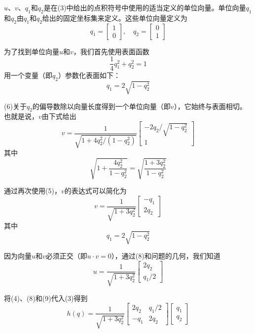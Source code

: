 \documentclass[12pt,a4paper]{ctexart}
\begin{document}
$u$、$v$、$q_1$和$q_2$是在(3)中给出的点积符号中使用的适当定义的单位向量。单位向量$q_1$和$q_2$由$q_1$和$q_2$给出的固定坐标集来定义。这些单位向量定义为
\begin{equation}
q_1 = \begin{bmatrix} 1 \\ 0 \end{bmatrix}, \quad q_2 = \begin{bmatrix} 0 \\ 1 \end{bmatrix}
\end{equation}

为了找到单位向量$u$和$v$，我们首先使用表面函数
\begin{equation}
\frac{1}{4}q_1^2 + q_2^2 = 1
\end{equation}
用一个变量（即$q_2$）参数化表面如下：
\begin{equation}
q_1 = 2\sqrt{1 - q_2^2}
\end{equation}

(6)关于$q_2$的偏导数除以向量长度得到一个单位向量（即$v$），它始终与表面相切。也就是说，$v$由下式给出
\begin{equation}
v = \frac{1}{\sqrt{1 + 4q_2^2/(1 - q_2^2)}} \begin{bmatrix} -2q_2/\sqrt{1 - q_2^2} \\ 1 \end{bmatrix}
\end{equation}
其中
\[
\sqrt{1 + \frac{4q_2^2}{1 - q_2^2}} = \sqrt{\frac{1 + 3q_2^2}{1 - q_2^2}}
\]

通过再次使用(5)，$v$的表达式可以简化为
\begin{equation}
v = \frac{1}{\sqrt{1 + 3q_2^2}} \begin{bmatrix} -q_1 \\ 2q_2 \end{bmatrix}
\end{equation}
其中
\[
q_1 = 2\sqrt{1 - q_2^2}
\]

因为向量$u$和$v$必须正交（即$u \cdot v = 0$），通过(8)和问题的几何，我们知道
\begin{equation}
u = \frac{1}{\sqrt{1 + 3q_2^2}} \begin{bmatrix} 2q_2 \\ q_1/2 \end{bmatrix}
\end{equation}

将(4)、(8)和(9)代入(3)得到
\begin{equation}
h(q) = \frac{1}{\sqrt{1 + 3q_2^2}} \begin{bmatrix} 2q_2 & q_1/2 \\ -q_1 & 2q_2 \end{bmatrix} \begin{bmatrix} q_1 \\ q_2 \end{bmatrix}
\end{equation}
\end{document}
